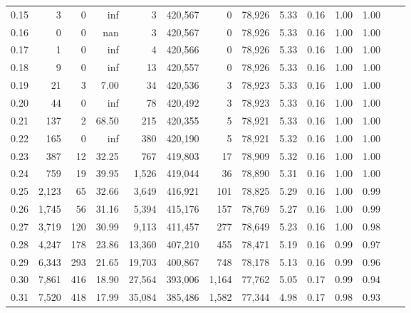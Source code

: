 \begin{tabular}{rrrrrrrrrrrrrr}
0.15 &       3 &      0 &     inf &        3 &  420,567 &       0 &  78,926 &  5.33 &  0.16 &  1.00 &      1.00 \\
0.16 &       0 &      0 &     nan &        3 &  420,567 &       0 &  78,926 &  5.33 &  0.16 &  1.00 &      1.00 \\
0.17 &       1 &      0 &     inf &        4 &  420,566 &       0 &  78,926 &  5.33 &  0.16 &  1.00 &      1.00 \\
0.18 &       9 &      0 &     inf &       13 &  420,557 &       0 &  78,926 &  5.33 &  0.16 &  1.00 &      1.00 \\
0.19 &      21 &      3 &    7.00 &       34 &  420,536 &       3 &  78,923 &  5.33 &  0.16 &  1.00 &      1.00 \\
0.20 &      44 &      0 &     inf &       78 &  420,492 &       3 &  78,923 &  5.33 &  0.16 &  1.00 &      1.00 \\
0.21 &     137 &      2 &   68.50 &      215 &  420,355 &       5 &  78,921 &  5.33 &  0.16 &  1.00 &      1.00 \\
0.22 &     165 &      0 &     inf &      380 &  420,190 &       5 &  78,921 &  5.32 &  0.16 &  1.00 &      1.00 \\
0.23 &     387 &     12 &   32.25 &      767 &  419,803 &      17 &  78,909 &  5.32 &  0.16 &  1.00 &      1.00 \\
0.24 &     759 &     19 &   39.95 &    1,526 &  419,044 &      36 &  78,890 &  5.31 &  0.16 &  1.00 &      1.00 \\
0.25 &   2,123 &     65 &   32.66 &    3,649 &  416,921 &     101 &  78,825 &  5.29 &  0.16 &  1.00 &      0.99 \\
0.26 &   1,745 &     56 &   31.16 &    5,394 &  415,176 &     157 &  78,769 &  5.27 &  0.16 &  1.00 &      0.99 \\
0.27 &   3,719 &    120 &   30.99 &    9,113 &  411,457 &     277 &  78,649 &  5.23 &  0.16 &  1.00 &      0.98 \\
0.28 &   4,247 &    178 &   23.86 &   13,360 &  407,210 &     455 &  78,471 &  5.19 &  0.16 &  0.99 &      0.97 \\
0.29 &   6,343 &    293 &   21.65 &   19,703 &  400,867 &     748 &  78,178 &  5.13 &  0.16 &  0.99 &      0.96 \\
0.30 &   7,861 &    416 &   18.90 &   27,564 &  393,006 &   1,164 &  77,762 &  5.05 &  0.17 &  0.99 &      0.94 \\
0.31 &   7,520 &    418 &   17.99 &   35,084 &  385,486 &   1,582 &  77,344 &  4.98 &  0.17 &  0.98 &      0.93 \\

\end{tabular}
